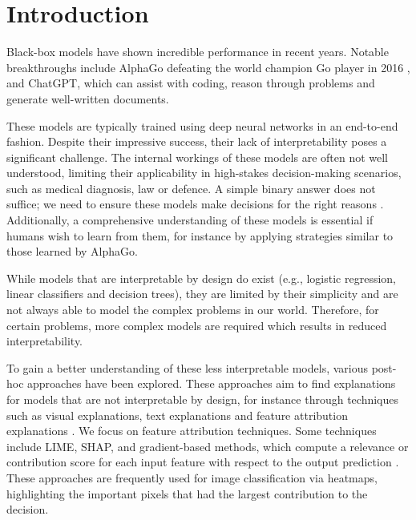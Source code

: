 \chapter{Introduction}

\setcounter{page}{1} %



Black-box models have shown incredible performance in recent years. Notable breakthroughs include AlphaGo defeating the world champion Go player in 2016 \citep{fuAlphaGoMonteCarlo2016}, and ChatGPT, which can assist with coding, reason through problems and generate well-written documents.

These models are typically trained using deep neural networks in an end-to-end fashion. Despite their impressive success, their lack of interpretability poses a significant challenge. The internal workings of these models are often not well understood, limiting their applicability in high-stakes decision-making scenarios, such as medical diagnosis, law or defence. A simple binary answer does not suffice; we need to ensure these models make decisions for the right reasons \citep{alammarExplainableAIGuide2021}. Additionally, a comprehensive understanding of these models is essential if humans wish to learn from them, for instance by applying strategies similar to those learned by AlphaGo.

While models that are interpretable by design do exist (e.g., logistic regression, linear classifiers and decision trees), they are limited by their simplicity and are not always able to model the complex problems in our world. Therefore, for certain problems, more complex models are required which results in reduced interpretability.

To gain a better understanding of these less interpretable models, various post-hoc approaches have been explored. These approaches aim to find explanations for models that are not interpretable by design, for instance through techniques such as visual explanations, text explanations and feature attribution explanations \citep{barredoarrietaExplainableArtificialIntelligence2020a}. We focus on feature attribution techniques. Some techniques include LIME, SHAP, and gradient-based methods, which compute a relevance or contribution score for each input feature with respect to the output prediction \citep{simonyanDeepConvolutionalNetworks2014, ribeiroWhyShouldTrust2016, lundbergUnifiedApproachInterpreting2017, molnarInterpretableMachineLearning2022}. These approaches are frequently used for image classification via heatmaps, highlighting the important pixels that had the largest contribution to the decision.

